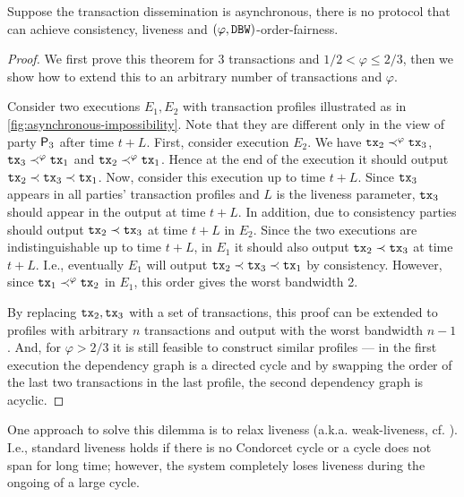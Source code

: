 \begin{theorem} \label{thm:liveness-fairness-async}
    Suppose the transaction dissemination is asynchronous, there is no protocol that can achieve consistency, liveness and $(\varphi, \mathtt{DBW})$-order-fairness.
\end{theorem}

\begin{proof}
    We first prove this theorem for 3 transactions and $1 / 2 < \varphi \le 2 / 3$, then we show how to extend this to an arbitrary number of transactions and $\varphi$.

    Consider two executions $E_1, E_2$ with transaction profiles illustrated as in \cref{fig:asynchronous-impossibility}.
    Note that they are different only in the view of party $\mathsf{P}_3$ after time $t + L$.
    First, consider execution $E_2$. We have $\mathtt{tx}_2 \prec^\varphi \mathtt{tx}_3$, $\mathtt{tx}_3 \prec^\varphi \mathtt{tx}_1$ and $\mathtt{tx}_2 \prec^\varphi \mathtt{tx}_1$.
    Hence at the end of the execution it should output $\mathtt{tx}_2 \prec \mathtt{tx}_3 \prec \mathtt{tx}_1$.
    Now, consider this execution up to time $t + L$.
    Since $\mathtt{tx}_3$ appears in all parties' transaction profiles and $L$ is the liveness parameter, $\mathtt{tx}_3$ should appear in the output at time $t + L$.
    In addition, due to consistency parties should output $\mathtt{tx}_2 \prec \mathtt{tx}_3$ at time $t + L$ in $E_2$.
    Since the two executions are indistinguishable up to time $t + L$, in $E_1$ it should also output $\mathtt{tx}_2 \prec \mathtt{tx}_3$ at time $t + L$.
    I.e., eventually $E_1$ will output $\mathtt{tx}_2 \prec \mathtt{tx}_3 \prec \mathtt{tx}_1$ by consistency.
    However, since $\mathtt{tx}_1 \prec^\varphi \mathtt{tx}_2$ in $E_1$, this order gives the worst bandwidth 2.

    

    By replacing $\mathtt{tx}_2, \mathtt{tx}_3$ with a set of transactions, this proof can be extended to profiles with arbitrary $n$ transactions and output with the worst bandwidth $n - 1$.
    And, for $\varphi > 2 / 3$ it is still feasible to construct similar profiles --- in the first execution the dependency graph is a directed cycle and by swapping the order of the last two transactions in the last profile, the second dependency graph is acyclic.
\end{proof}


One approach to solve this dilemma is to relax liveness (a.k.a. weak-liveness, cf. \cite{C:KZGJ20}).
%
I.e., standard liveness holds if there is no Condorcet cycle or a cycle does not span for long time; however, the system completely loses liveness during the ongoing of a large cycle.

